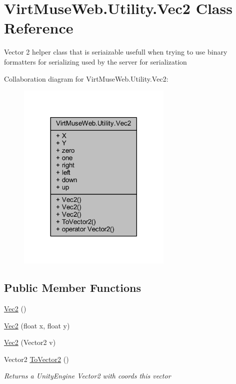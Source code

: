\hypertarget{class_virt_muse_web_1_1_utility_1_1_vec2}{}\section{Virt\+Muse\+Web.\+Utility.\+Vec2 Class Reference}
\label{class_virt_muse_web_1_1_utility_1_1_vec2}


Vector 2 helper class that is seriaizable usefull when trying to use binary formatters for serializing used by the server for serialization  




Collaboration diagram for Virt\+Muse\+Web.\+Utility.\+Vec2\+:
\nopagebreak
\begin{figure}[H]
\begin{center}
\leavevmode
\includegraphics[width=209pt]{class_virt_muse_web_1_1_utility_1_1_vec2__coll__graph}
\end{center}
\end{figure}
\subsection*{Public Member Functions}
\begin{DoxyCompactItemize}
\item 
\mbox{\hyperlink{class_virt_muse_web_1_1_utility_1_1_vec2_af196c02ce65aa026434e1d95aa7cc0f1}{Vec2}} ()
\item 
\mbox{\hyperlink{class_virt_muse_web_1_1_utility_1_1_vec2_af19c7fb268d048f98483f1cba35a6b9c}{Vec2}} (float x, float y)
\item 
\mbox{\hyperlink{class_virt_muse_web_1_1_utility_1_1_vec2_a1367b81b0ecae3dae49a9aebf32e23dd}{Vec2}} (Vector2 v)
\item 
Vector2 \mbox{\hyperlink{class_virt_muse_web_1_1_utility_1_1_vec2_adf9d148c0badd947b5655efbc24f560e}{To\+Vector2}} ()
\begin{DoxyCompactList}\small\item\em Returns a Unity\+Engine Vector2 with coords this vector \end{DoxyCompactList}\end{DoxyCompactItemize}
